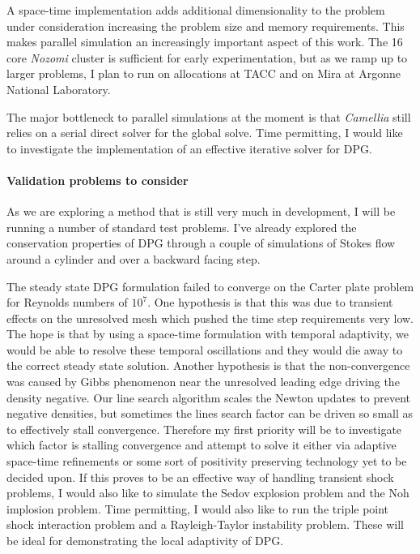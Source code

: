 \documentclass[letterpaper]{article}
\begin{document}
A space-time implementation adds additional dimensionality to the problem under consideration increasing the problem size and memory requirements.
This makes parallel simulation an increasingly important aspect of this work.
The 16 core \emph{Nozomi} cluster is sufficient for early experimentation, but as we ramp up to larger problems, I plan to run on allocations at TACC and on Mira at Argonne National Laboratory.

The major bottleneck to parallel simulations at the moment is that \emph{Camellia} still relies on a serial direct solver for the global solve.
Time permitting, I would like to investigate the implementation of an effective iterative solver for DPG.

\paragraph{Validation problems to consider}
As we are exploring a method that is still very much in development, I will be running a number of standard test problems.
I've already explored the conservation properties of DPG through a couple of simulations of Stokes flow around a cylinder and over
a backward facing step.

The steady state DPG formulation failed to converge on the Carter plate problem for Reynolds numbers of $10^7$. 
One hypothesis is that this was due to transient effects on the unresolved mesh which pushed the time step requirements very low.
The hope is that by using a space-time formulation with temporal adaptivity, we would be able to resolve these temporal oscillations
and they would die away to the correct steady state solution.
Another hypothesis is that the non-convergence was caused by Gibbs phenomenon near the unresolved leading edge driving the density negative.
Our line search algorithm scales the Newton updates to prevent negative densities, but sometimes the lines search factor can be driven so small
as to effectively stall convergence.
Therefore my first priority will be to investigate which factor is stalling convergence and attempt to solve it either via adaptive space-time
refinements or some sort of positivity preserving technology yet to be decided upon.
If this proves to be an effective way of handling transient shock problems, 
I would also like to simulate the Sedov explosion problem and the Noh implosion problem.
Time permitting, I would also like to run the triple point shock interaction problem and a Rayleigh-Taylor instability problem.
These will be ideal for demonstrating the local adaptivity of DPG.
\end{document}
